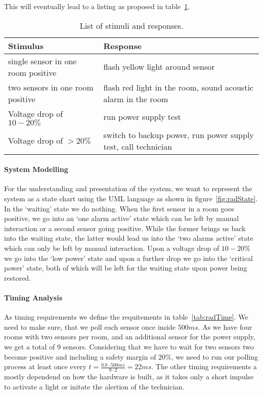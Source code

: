 \documentclass[10pt,a4paper,titlepage,draft]{article} %
\newcommand{\red}[1]
{\textcolor{red}{#1}}
\begin{document}
This will eventually lead to a listing as proposed in table~\ref{tab:radWarner}.
\begin{table}[h]
\begin{tabular}{|p{4cm}|p{7.2cm}|}
\hline %
\rowcolor{gray} Stimulus & Response \\
\hline %
single sensor in one room positive & flash yellow light around sensor \\
\hline %
two sensors in one room positive & flash red light in the room, sound acoustic alarm in the room\\
\hline %
Voltage drop of $10-20\%$ & run power supply test\\
\hline %
Voltage drop of $>20\%$ & switch to backup power, run power supply test, call technician\\
\hline %
\end{tabular}
\caption{List of stimuli and responses.}
\label{tab:radWarner}
\end{table}

\paragraph{System Modelling}

For the understanding and presentation of the system, we want to represent the system as a state chart using the UML language as shown in figure~\ref{fig:radState}.
In the `waiting' state we do nothing.
When the first sensor in a room goes positive, we go into an `one alarm active' state which can be left by manual interaction or a second sensor going positive.
While the former brings us back into the waiting state, the latter would lead us into the `two alarms active' state which can only be left by manual interaction.
Upon a voltage drop of $10-20\%$ we go into the `low power' state and upon a further drop we go into the `critical power' state, both of which will be left for the waiting state upon power being restored.

\paragraph{Timing Analysis}
As timing requirements we define the requitements in table~\ref{tab:radTime}\marginpar{\red{Fix the numbering??}}.
We need to make sure, that we poll each sensor once inside $500ms$.
As we have four rooms with two sensors per room, and an additional sensor for the power supply, we get a total of 9 sensors.
Considering that we have to wait for two sensors two become positive and including a safety margin of $20\%$, we need to run our polling process at least once every $\displaystyle t=\frac{0.8\cdot500ms}{9\cdot2}=22ms$. The other timing requirements a mostly dependend on how the hardware is built, as it takes only a short impulse to activate a light or initate the alertion of the technician.
\end{document}
